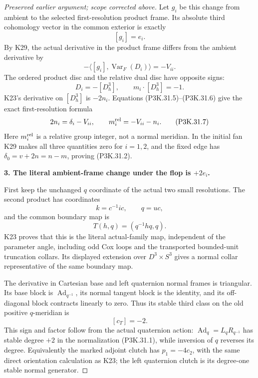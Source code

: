\begin{proof}[Preserved earlier argument; scope corrected above]
Let \(g_i\) be this change from ambient to the selected
first-resolution product frame. Its absolute third
cohomology vector in the common exterior is exactly
\[
                              [g_i]=e_i.
                                                        \tag{P3K.31.5}
\]
By K29, the actual derivative in the product frame
differs from the ambient derivative by
\[
           -\langle[g_i],\operatorname{Var}_F(D_i)\rangle=-V_{ii}.
\]
The ordered product disc and the relative dual
disc have opposite signs:
\[
              D_i=-[D^3_h],\qquad
              m_i\cdot[D^3_h]=-1.
                                                        \tag{P3K.31.6}
\]
K23's derivative on \([D^3_h]\) is \(-2n_i\). Equations
(P3K.31.5)--(P3K.31.6) give the exact first-resolution formula
\[
                    2n_i=\delta_i-V_{ii},\qquad
                    m_i^{\rm rel}=-V_{ii}-n_i.
                                                        \tag{P3K.31.7}
\]
Here \(m_i^{\rm rel}\) is a relative group integer, not a
normal meridian. In the initial fan K29 makes all three
quantities zero for \(i=1,2\), and the fixed edge has
\(\delta_0=v+2n=n-m\), proving (P3K.31.2).

\par\medskip\noindent\textbf{3. The literal ambient-frame change under the flop is \(+2e_i\).}\enspace

First keep the unchanged \(q\) coordinate of the actual
two small resolutions. The second product has coordinates
\[
             k=c^{-1}ic,\qquad q=uc,
\]
and the common boundary map is
\[
                 T(h,q)=(q^{-1}h q,q).
                                                        \tag{P3K.31.8}
\]
K23 proves that this is the literal actual-family map,
independent of the parameter angle, including odd Cox
loops and the transported bounded-unit truncation collars.
Its displayed extension over \(D^3\times S^3\) gives a
normal collar representative of the same boundary map.

The derivative in Cartesian base and left quaternion
normal frames is triangular. Its base block is
\(\operatorname{Ad}_{q^{-1}}\), its normal tangent block
is the identity, and its off-diagonal block contracts
linearly to zero. Thus its stable third class on the
old positive \(q\)-meridian is
\[
                         [c_T]=-2.
                                                        \tag{P3K.31.9}
\]
This sign and factor follow from the actual quaternion
action: \(\operatorname{Ad}_q=L_qR_{q^{-1}}\) has stable
degree \(+2\) in the normalization (P3K.31.1), while inversion
of \(q\) reverses its degree. Equivalently the marked
adjoint clutch has \(p_1=-4c_2\), with the same direct
orientation calculation as K23; the left quaternion
clutch is its degree-one stable normal generator.


\end{proof}
